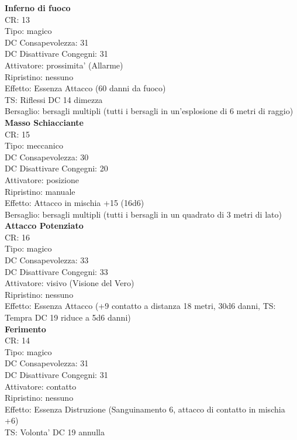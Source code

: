 \documentclass[a4paper,11pt,twoside,openany]{dndbook}
\begin{document}
\begin{multicols}{2}
\textbf{Inferno di fuoco}\\
CR: 13 \\
Tipo: magico \\
DC Consapevolezza: 31 \\
DC Disattivare Congegni: 31 \\
Attivatore: prossimita' (Allarme) \\
Ripristino: nessuno \\
Effetto: Essenza Attacco (60 danni da fuoco) \\
TS: Riflessi DC 14 dimezza \\
Bersaglio: bersagli multipli (tutti i bersagli in un’esplosione di 6 metri di raggio)\\

\textbf{Masso Schiacciante}\\
CR: 15 \\
Tipo: meccanico \\
DC Consapevolezza: 30 \\
DC Disattivare Congegni: 20 \\
Attivatore: posizione \\
Ripristino: manuale \\
Effetto: Attacco in mischia +15 (16d6) \\
Bersaglio: bersagli multipli (tutti i bersagli in un quadrato di 3 metri di lato)\\

\textbf{Attacco Potenziato}\\
CR: 16 \\
Tipo: magico \\
DC Consapevolezza: 33 \\
DC Disattivare Congegni: 33 \\
Attivatore: visivo (Visione del Vero) \\
Ripristino: nessuno \\
Effetto: Essenza Attacco (+9 contatto a distanza 18 metri, 30d6 danni, TS: Tempra DC 19 riduce a 5d6 danni)\\

\textbf{Ferimento}\\
CR: 14 \\
Tipo: magico \\
DC Consapevolezza: 31 \\
DC Disattivare Congegni: 31 \\
Attivatore: contatto \\
Ripristino: nessuno \\
Effetto: Essenza Distruzione (Sanguinamento 6, attacco di contatto in mischia +6)\\
TS: Volonta' DC 19 annulla\\


\end{multicols}
\end{document}
